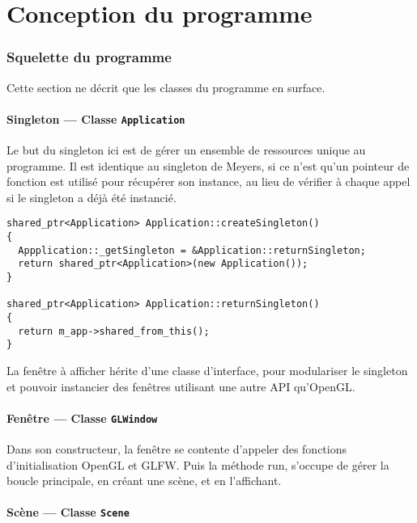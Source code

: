 \documentclass[pdftex, 11pt, a4paper, titlepage]{article}
\begin{document}
\pagebreak
\part{Conception du programme}

\section{Squelette du programme}

Cette section ne décrit que les classes du programme en surface.

\subsection{Singleton --- Classe \texttt{Application}}

Le but du singleton ici est de gérer un ensemble de ressources unique
au programme.  Il est identique au singleton de Meyers, si ce n'est
qu'un pointeur de fonction est utilisé pour récupérer son instance, au
lieu de vérifier à chaque appel si le singleton a déjà été instancié.

\lstset{language=C++}

\begin{lstlisting}
shared_ptr<Application> Application::createSingleton()
{
  Appplication::_getSingleton = &Application::returnSingleton;
  return shared_ptr<Application>(new Application());
}

shared_ptr<Application> Application::returnSingleton()
{
  return m_app->shared_from_this();
}
\end{lstlisting}

La fenêtre à afficher hérite d'une classe d'interface, pour
modulariser le singleton et pouvoir instancier des fenêtres utilisant
une autre API qu'OpenGL.

\subsection{Fenêtre --- Classe \texttt{GLWindow}}

Dans son constructeur, la fenêtre se contente d'appeler des fonctions
d'initialisation OpenGL et GLFW. Puis la méthode run, s'occupe de
gérer la boucle principale, en créant une scène, et en l'affichant.

\subsection{Scène --- Classe \texttt{Scene}}
\end{document}
